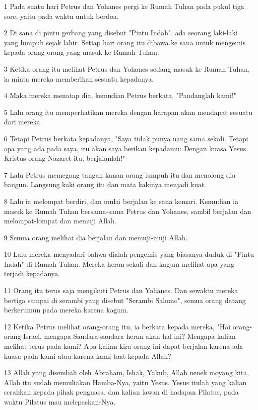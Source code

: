 \par 1 Pada suatu hari Petrus dan Yohanes pergi ke Rumah Tuhan pada pukul tiga sore, yaitu pada waktu untuk berdoa.
\par 2 Di sana di pintu gerbang yang disebut "Pintu Indah", ada seorang laki-laki yang lumpuh sejak lahir. Setiap hari orang itu dibawa ke sana untuk mengemis kepada orang-orang yang masuk ke Rumah Tuhan.
\par 3 Ketika orang itu melihat Petrus dan Yohanes sedang masuk ke Rumah Tuhan, ia minta mereka memberikan sesuatu kepadanya.
\par 4 Maka mereka menatap dia, kemudian Petrus berkata, "Pandanglah kami!"
\par 5 Lalu orang itu memperhatikan mereka dengan harapan akan mendapat sesuatu dari mereka.
\par 6 Tetapi Petrus berkata kepadanya, "Saya tidak punya uang sama sekali. Tetapi apa yang ada pada saya, itu akan saya berikan kepadamu: Dengan kuasa Yesus Kristus orang Nazaret itu, berjalanlah!"
\par 7 Lalu Petrus memegang tangan kanan orang lumpuh itu dan menolong dia bangun. Langsung kaki orang itu dan mata kakinya menjadi kuat.
\par 8 Lalu ia melompat berdiri, dan mulai berjalan ke sana kemari. Kemudian ia masuk ke Rumah Tuhan bersama-sama Petrus dan Yohanes, sambil berjalan dan melompat-lompat dan memuji Allah.
\par 9 Semua orang melihat dia berjalan dan memuji-muji Allah.
\par 10 Lalu mereka menyadari bahwa dialah pengemis yang biasanya duduk di "Pintu Indah" di Rumah Tuhan. Mereka heran sekali dan kagum melihat apa yang terjadi kepadanya.
\par 11 Orang itu terus saja mengikuti Petrus dan Yohanes. Dan sewaktu mereka bertiga sampai di serambi yang disebut "Serambi Salomo", semua orang datang berkerumun pada mereka karena kagum.
\par 12 Ketika Petrus melihat orang-orang itu, ia berkata kepada mereka, "Hai orang-orang Israel, mengapa Saudara-saudara heran akan hal ini? Mengapa kalian melihat terus pada kami? Apa kalian kira orang ini dapat berjalan karena ada kuasa pada kami atau karena kami taat kepada Allah?
\par 13 Allah yang disembah oleh Abraham, Ishak, Yakub, Allah nenek moyang kita, Allah itu sudah memuliakan Hamba-Nya, yaitu Yesus. Yesus itulah yang kalian serahkan kepada pihak penguasa, dan kalian lawan di hadapan Pilatus, pada waktu Pilatus mau melepaskan-Nya.
